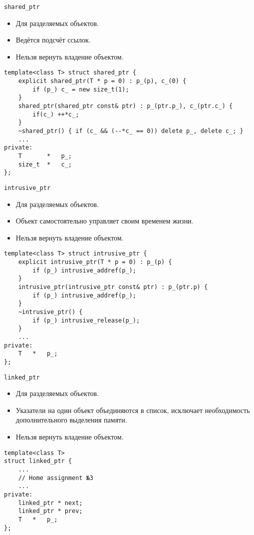 \documentclass{beamer}
\begin{document}
\begin{frame}[fragile]{\texttt{shared\_ptr}}
\small
\begin{itemize}
    \item Для разделяемых объектов.
    \item Ведётся подсчёт ссылок.
    \item Нельзя вернуть владение объектом.
\end{itemize}

    \begin{lstlisting}
template<class T> struct shared_ptr {
    explicit shared_ptr(T * p = 0) : p_(p), c_(0) {
        if (p_) c_ = new size_t(1);    
    }
    shared_ptr(shared_ptr const& ptr) : p_(ptr.p_), c_(ptr.c_) {
        if(c_) ++*c_;
    }
    ~shared_ptr() { if (c_ && (--*c_ == 0)) delete p_, delete c_; }
    ...
private:
    T       *   p_;
    size_t  *   c_;
};
    \end{lstlisting}
\end{frame}

\begin{frame}[fragile]{\texttt{intrusive\_ptr}}
\small
\begin{itemize}
    \item Для разделяемых объектов.
    \item Объект самостоятельно управляет своим временем жизни.
    \item Нельзя вернуть владение объектом.
\end{itemize}

    \begin{lstlisting}
template<class T> struct intrusive_ptr {
    explicit intrusive_ptr(T * p = 0) : p_(p) {
        if (p_) intrusive_addref(p_);
    }
    intrusive_ptr(intrusive_ptr const& ptr) : p_(ptr.p) {
        if (p_) intrusive_addref(p_);
    }
    ~intrusive_ptr() { 
        if (p_) intrusive_release(p_);
    }
    ...
private:
    T   *   p_;
};
    \end{lstlisting}
\end{frame}

\begin{frame}[fragile]{\texttt{linked\_ptr}}
\small
\begin{itemize}
    \item Для разделяемых объектов.
    \item Указатели на один объект объединяются в список, исключает
        необходимость дополнительного выделения памяти.
    \item Нельзя вернуть владение объектом.
\end{itemize}
    \begin{lstlisting}
template<class T>
struct linked_ptr {
    ...
    // Home assignment №3
    ...
private:
    linked_ptr * next; 
    linked_ptr * prev;
    T   *   p_;
};
    \end{lstlisting}
\end{frame}
\end{document}
